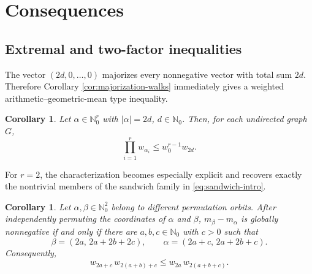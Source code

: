 \documentclass[11pt]{article}
\newtheorem{corollary}[definition]{Corollary}
\newcommand{\Nat}{\mathbb{N}}
\theoremstyle{remark}
\begin{document}

\section{Consequences}

\subsection{Extremal and two-factor inequalities}

The vector $(2d,0,\ldots,0)$ majorizes every nonnegative vector with total sum $2d$.  Therefore Corollary \ref{cor:majorization-walks} immediately gives a weighted arithmetic--geometric-mean type inequality.

\begin{corollary}\label{cor:AG-walks}
Let $\alpha\in\Nat_0^r$ with $|\alpha|=2d$, $d\in\Nat_0$.  Then, for each undirected graph $G$,
\begin{equation*}\label{eq:AG-walks}
  \prod_{i=1}^r w_{\alpha_i}
  \leq w_0^{r-1}w_{2d}.
\end{equation*}
\end{corollary}

For $r=2$, the characterization becomes especially explicit and recovers exactly the nontrivial members of the sandwich family in \eqref{eq:sandwich-intro}.

\begin{corollary}\label{cor:two-factor}
Let $\alpha,\beta\in\Nat_0^2$ belong to different permutation orbits. After independently permuting the coordinates of $\alpha$ and $\beta$, $m_\beta-m_\alpha$ is globally nonnegative if and only if there are $a,b,c\in\Nat_0$ with $c>0$ such that
\begin{equation*}\label{eq:two-factor-parameters}
    \beta=(2a,\,2a+2b+2c), \qquad
    \alpha=(2a+c,\,2a+2b+c).
\end{equation*}
Consequently,
\[
  w_{2a+c}\,w_{2(a+b)+c}
  \leq w_{2a}\,w_{2(a+b+c)}.
\]
\end{corollary}
\end{document}
